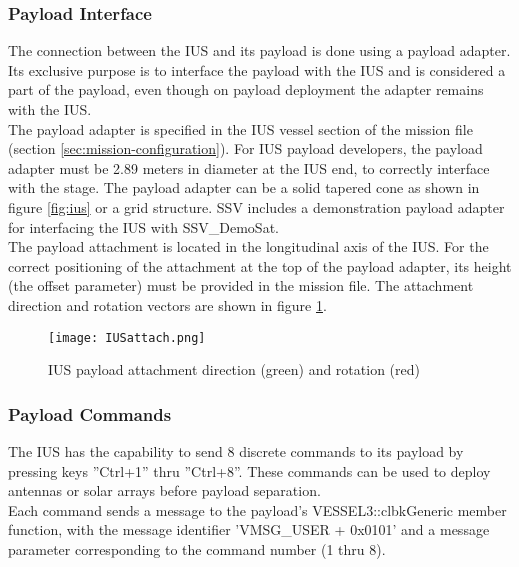 \documentclass[Space_Shuttle_Vessel_Manual.tex]{subfiles}
\begin{document}
\begin{multicols*}{2}
\subsubsection{Payload Interface}
The connection between the IUS and its payload is done using a payload adapter. Its exclusive purpose is to interface the payload with the IUS and is considered a part of the payload, even though on payload deployment the adapter remains with the IUS.\\
The payload adapter is specified in the IUS vessel section of the mission file (section \ref{sec:mission-configuration}).
For IUS payload developers, the payload adapter must be 2.89 meters in diameter at the IUS end, to correctly interface with the stage. The payload adapter can be a solid tapered cone as shown in figure \ref{fig:ius} or a grid structure. SSV includes a demonstration payload adapter for interfacing the IUS with SSV\_DemoSat.
\\
The payload attachment is located in the longitudinal axis of the IUS. For the correct positioning of the attachment at the top of the payload adapter, its height (the offset parameter) must be provided in the mission file. The attachment direction and rotation vectors are shown in figure \ref{fig:IUSattach}.

\begin{figure}[H]
  \centering
	\captionsetup{justification=centering}
  \texttt{[image: IUSattach.png]}
  \caption{IUS payload attachment direction (green) and rotation (red)}
  \label{fig:IUSattach}
\end{figure}

\subsubsection{Payload Commands}
The IUS has the capability to send 8 discrete commands to its payload by pressing keys ''Ctrl+1'' thru ''Ctrl+8''. These commands can be used to deploy antennas or solar arrays before payload separation.
\\
Each command sends a message to the payload's VESSEL3::clbkGeneric member function, with the message identifier 'VMSG\_USER + 0x0101' and a message parameter corresponding to the command number (1 thru 8).\\

\end{multicols*}



\newpage
\end{document}
